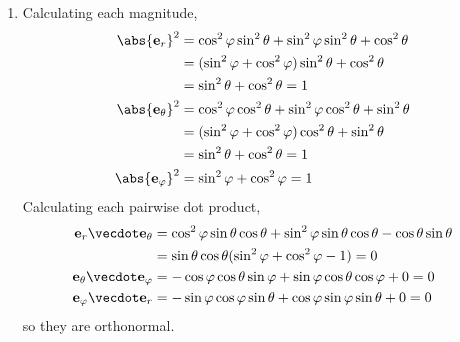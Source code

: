 \documentclass[fleqn,a4paper,11pt]{article}
\begin{document}
\begin{enumerate}
\begin{enumerate}[(i)]
    \end{enumerate}
   \item
    Calculating each magnitude,
    \begin{align*}
     \abs{\vec e_r}^2 &= \cos^2 \varphi \sin^2 \theta
                         + \sin^2 \varphi \sin^2 \theta + \cos^2 \theta \\
                      &= (\sin^2 \varphi + \cos^2 \varphi)\sin^2 \theta
                         + \cos^2 \theta \\
                      &= \sin^2 \theta + \cos^2 \theta = 1 \\
     \abs{\vec e_\theta}^2 &= \cos^2 \varphi \cos^2 \theta
                         + \sin^2 \varphi \cos^2 \theta + \sin^2 \theta \\
                      &= (\sin^2 \varphi + \cos^2 \varphi)\cos^2 \theta
                         + \sin^2 \theta \\
                      &= \sin^2 \theta + \cos^2 \theta = 1 \\
     \abs{\vec e_\varphi}^2 &= \sin^2 \varphi + \cos^2 \varphi = 1
    \end{align*}
    Calculating each pairwise dot product,
    \begin{align*}
     \vec e_r \vecdot \vec e_\theta &=
      \cos^2 \varphi \sin \theta \cos \theta
      + \sin^2 \varphi \sin \theta \cos \theta - \cos \theta \sin \theta \\
      &= \sin \theta \cos \theta(\sin^2 \varphi + \cos^2 \varphi - 1) = 0 \\
     \vec e_\theta \vecdot \vec e_\varphi &=
      -\cos \varphi \cos \theta \sin \varphi
      + \sin \varphi \cos \theta \cos \varphi + 0 = 0 \\
     \vec e_\varphi \vecdot \vec e_r &=
      -\sin \varphi \cos \varphi \sin \theta
      + \cos \varphi \sin \varphi \sin \theta + 0 = 0
    \end{align*}
    so they are orthonormal.


\end{enumerate}
\end{document}
